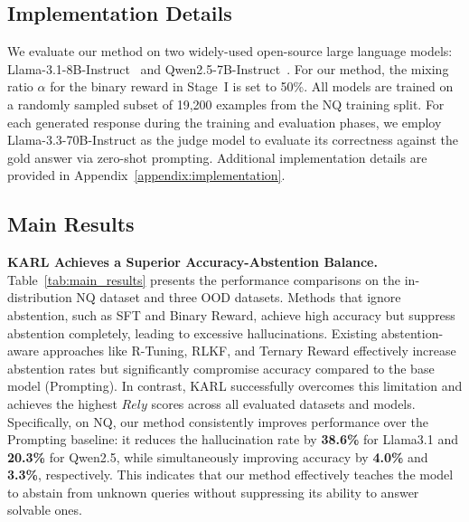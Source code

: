 \documentclass{article} %
\newcommand{\framename}{\textsc{KARL}}
\begin{document}
\subsection{Implementation Details}
We evaluate our method on two widely-used open-source large language models: Llama-3.1-8B-Instruct~\citep{Llama3} and Qwen2.5-7B-Instruct~\citep{Qwen2.5}. For our method, the mixing ratio $\alpha$ for the binary reward in Stage~I is set to 50\%. 
All models are trained on a randomly sampled subset of 19,200 examples from the NQ training split. For each generated response during the training and evaluation phases, we employ Llama-3.3-70B-Instruct as the judge model to evaluate its correctness against the gold answer via zero-shot prompting. Additional implementation details are provided in Appendix~\ref{appendix:implementation}.

\subsection{Main Results}

\noindent
\textbf{\framename{} Achieves a Superior Accuracy-Abstention Balance.}
Table~\ref{tab:main_results} presents the performance comparisons on the in-distribution NQ dataset and three OOD datasets.
Methods that ignore abstention, such as SFT and Binary Reward, achieve high accuracy but suppress abstention completely, leading to excessive hallucinations.
Existing abstention-aware approaches like R-Tuning, RLKF, and Ternary Reward effectively increase abstention rates but significantly compromise accuracy compared to the base model (Prompting).
In contrast, \framename{} successfully overcomes this limitation and achieves the highest $Rely$ scores across all evaluated datasets and models.
Specifically, on NQ, our method consistently improves performance over the Prompting baseline: it reduces the hallucination rate by \textbf{38.6\%} for Llama3.1 and \textbf{20.3\%} for Qwen2.5, while simultaneously improving accuracy by \textbf{4.0\%} and \textbf{3.3\%}, respectively.
This indicates that our method effectively teaches the model to abstain from unknown queries without suppressing its ability to answer solvable ones.
\end{document}

